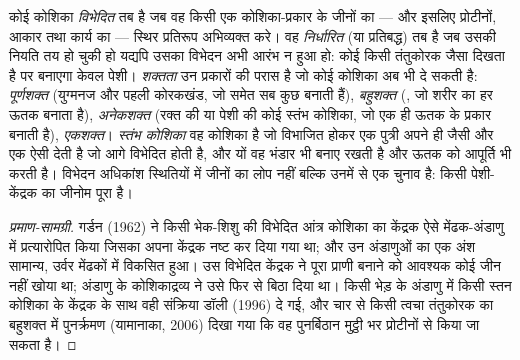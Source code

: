 \begin{definition}[विभेदन, निर्धारण, शक्तता]\label{def:b2:cell-differentiation:differentiation}
कोई कोशिका \emph{विभेदित} तब है जब वह किसी एक कोशिका-प्रकार के जीनों का
--- और इसलिए प्रोटीनों, आकार तथा कार्य का --- स्थिर प्रतिरूप
अभिव्यक्त करे। वह \emph{निर्धारित} (या प्रतिबद्ध) तब है जब उसकी नियति
तय हो चुकी हो यद्यपि उसका विभेदन अभी आरंभ न हुआ हो: कोई 
किसी तंतुकोरक जैसा दिखता है पर बनाएगा केवल पेशी। \emph{शक्तता}
उन प्रकारों की परास है जो कोई कोशिका अब भी दे सकती है: \emph{पूर्णशक्त}
(युग्मनज और पहली कोरकखंड, जो  समेत सब कुछ बनाती हैं),
\emph{बहुशक्त} (, जो शरीर का
हर ऊतक बनाता है), \emph{अनेकशक्त} (रक्त की या पेशी की कोई स्तंभ
कोशिका, जो एक ही ऊतक के प्रकार बनाती है),
\emph{एकशक्त}। \emph{स्तंभ कोशिका} वह कोशिका है जो विभाजित होकर
एक पुत्री अपने ही जैसी और एक ऐसी देती है जो आगे विभेदित होती है,
और यों वह भंडार भी बनाए रखती है और ऊतक को आपूर्ति भी करती है। विभेदन
अधिकांश स्थितियों में जीनों का लोप नहीं बल्कि उनमें से एक चुनाव है:
किसी पेशी-केंद्रक का जीनोम पूरा है।
\end{definition}
\begin{proof}[प्रमाण-सामग्री]
गर्डन (1962) ने किसी भेक-शिशु की विभेदित आंत्र कोशिका का
केंद्रक ऐसे मेंढक-अंडाणु में प्रत्यारोपित किया जिसका अपना केंद्रक
नष्ट कर दिया गया था; और उन अंडाणुओं का एक अंश सामान्य, उर्वर
मेंढकों में विकसित हुआ। उस विभेदित केंद्रक ने पूरा प्राणी बनाने को
आवश्यक कोई जीन नहीं खोया था; अंडाणु के कोशिकाद्रव्य ने उसे फिर से बिठा
दिया था। किसी भेड़ के अंडाणु में किसी स्तन कोशिका के केंद्रक के साथ वही
संक्रिया डॉली (1996) दे गई, और चार  से किसी त्वचा
तंतुकोरक का बहुशक्त  में पुनर्क्रमण (यामानाका,
2006) दिखा गया कि वह पुनर्बिठान मुट्ठी भर प्रोटीनों से किया जा सकता है।
\end{proof}

